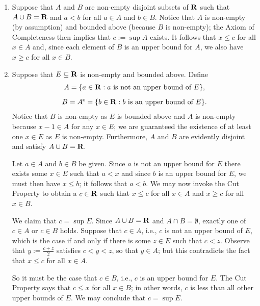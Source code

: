 \documentclass{lew98_solutions}
\begin{document}
\begin{solution}
    \begin{enumerate}
        \item Suppose that \( A \) and \( B \) are non-empty disjoint subsets of \( \mathbf{R} \) such that \( A \cup B = \mathbf{R} \) and \( a < b \) for all \( a \in A \) and \( b \in B \). Notice that \( A \) is non-empty (by assumption) and bounded above (because \( B \) is non-empty); the Axiom of Completeness then implies that \( c := \sup A \) exists. It follows that \( x \leq c \) for all \( x \in A \) and, since each element of \( B \) is an upper bound for \( A \), we also have \( x \geq c \) for all \( x \in B \).

        \item Suppose that \( E \subseteq \mathbf{R} \) is non-empty and bounded above. Define
        \begin{gather*}
            A = \{ a \in \mathbf{R} : a \text{ is not an upper bound of } E \}, \\[2mm]
            B = A^{\mathsf{c}} = \{ b \in \mathbf{R} : b \text{ is an upper bound of } E \}.
        \end{gather*}
        Notice that \( B \) is non-empty as \( E \) is bounded above and \( A \) is non-empty because \( x - 1 \in A \) for any \( x \in E \); we are guaranteed the existence of at least one \( x \in E \) as \( E \) is non-empty. Furthermore, \( A \) and \( B \) are evidently disjoint and satisfy \( A \cup B = \mathbf{R} \).
        
        Let \( a \in A \) and \( b \in B \) be given. Since \( a \) is not an upper bound for \( E \) there exists some \( x \in E \) such that \( a < x \) and since \( b \) is an upper bound for \( E \), we must then have \( x \leq b \); it follows that \( a < b \). We may now invoke the Cut Property to obtain a \( c \in \mathbf{R} \) such that \( x \leq c \) for all \( x \in A \) and \( x \geq c \) for all \( x \in B \).

        We claim that \( c = \sup E \). Since \( A \cup B = \mathbf{R} \) and \( A \cap B = \emptyset \), exactly one of \( c \in A \) or \( c \in B \) holds. Suppose that \( c \in A \), i.e., \( c \) is not an upper bound of \( E \), which is the case if and only if there is some \( z \in E \) such that \( c < z \). Observe that \( y := \tfrac{c + z}{2} \) satisfies \( c < y < z \), so that \( y \in A \); but this contradicts the fact that \( x \leq c \) for all \( x \in A \).
        
        So it must be the case that \( c \in B \), i.e., \( c \) is an upper bound for \( E \). The Cut Property says that \( c \leq x \) for all \( x \in B \); in other words, \( c \) is less than all other upper bounds of \( E \). We may conclude that \( c = \sup E \).


\end{enumerate}
\end{solution}
\end{document}
